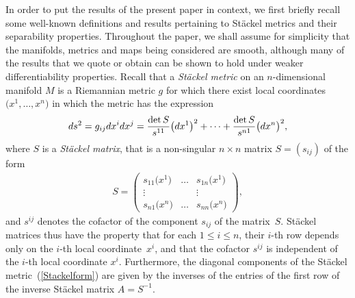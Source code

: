 \documentclass[11pt]{article}
\numberwithin{equation}{section}
\begin{document}
In order to put the results of the present paper in context, we first briefly recall some well-known definitions and results pertaining to St\"ackel metrics and their separability properties. Throughout the paper, we shall assume for simplicity that the manifolds, metrics and maps being considered are smooth, although many of the results that we quote or obtain can be shown to hold under weaker differentiability properties. Recall \cite{BCR1-2002, Eis1934, KaMi1980, Sta1897} that a {\emph {St\"ackel metric}} on an $n$-dimensional manifold $M$ is a Riemannian metric $g$ for which there exist local coordinates $\big(x^{1},\dots,x^{n}\big)$ in which the metric has the expression
\begin{gather}\label{Stackelform}
{\rm d}s^{2}=g_{ij}{\rm d}x^{i}{\rm d}x^{j}=\frac{\det S}{s^{11}}\big({\rm d}x^{1}\big)^{2}+\cdots+\frac{\det S}{s^{n1}}\big({\rm d}x^{n}\big)^{2},
\end{gather}
where $S$ is a {\emph{St\"ackel matrix}}, that is a non-singular $n\times n$ matrix $S=(s_{ij})$ of the form
\begin{gather}\label{StackelMatrix}
S=\left(
\begin{matrix}
s_{11}\big(x^{1}\big)&\dots&s_{1n}\big(x^{1}\big) \\
\vdots& & \vdots \\
s_{n1}\big(x^{n}\big)&\dots&s_{nn}\big(x^{n}\big)
\end{matrix}
\right),
\end{gather}
and $s^{ij}$ denotes the cofactor of the component $s_{ij}$ of the matrix~$S$. St\"ackel matrices thus have the property that for each $1\leq i \leq n$, their $i$-th row depends only on the $i$-th local coordinate~$x^{i}$, and that the cofactor $s^{ij}$ is independent of the $i$-th local coordinate $x^{i}$. Furthermore, the diagonal components of the St\"ackel metric~(\ref{Stackelform}) are given by the inverses of the entries of the first row of the inverse St\"ackel matrix $A=S^{-1}$.
\end{document}

